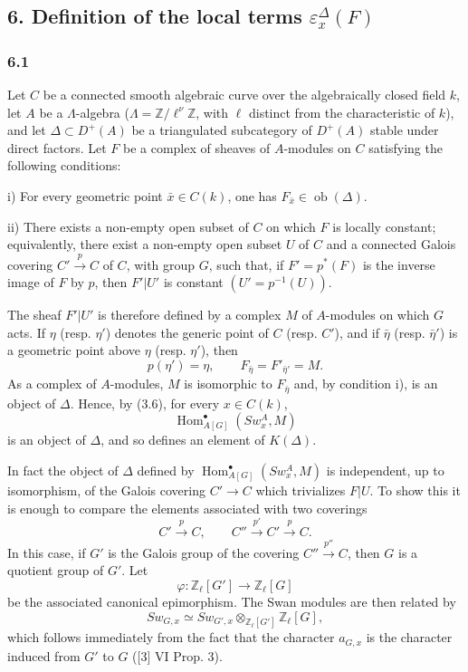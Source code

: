 \documentclass[11pt]{article}
\DeclareMathOperator{\Hom}{Hom}
\providecommand{\Ob}{\operatorname{ob}}
\providecommand{\Hom}{\operatorname{Hom}}
\providecommand{\Ob}{\operatorname{ob}}
\providecommand{\Ob}{\operatorname{Ob}}
\providecommand{\Hom}{\operatorname{Hom}}
\providecommand{\Ob}{\operatorname{ob}}
\begin{document}
\subsection*{6. Definition of the local terms $\varepsilon_x^\Delta(F)$}

\subsubsection*{6.1}

Let $C$ be a connected smooth algebraic curve over the algebraically closed field $k$, let $A$ be a $\Lambda$-algebra ($\Lambda=\mathbb Z/\ell^\nu\mathbb Z$, with $\ell$ distinct from the characteristic of $k$), and let $\Delta\subset D^+(A)$ be a triangulated subcategory of $D^+(A)$ stable under direct factors. Let $F$ be a complex of sheaves of $A$-modules on $C$ satisfying the following conditions:

i) For every geometric point $\bar x\in C(k)$, one has $F_{\bar x}\in\Ob(\Delta)$.

ii) There exists a non-empty open subset of $C$ on which $F$ is locally constant; equivalently, there exist a non-empty open subset $U$ of $C$ and a connected Galois covering $C'\xrightarrow{p}C$ of $C$, with group $G$, such that, if $F'=p^*(F)$ is the inverse image of $F$ by $p$, then $F'|U'$ is constant $(U'=p^{-1}(U))$.

The sheaf $F'|U'$ is therefore defined by a complex $M$ of $A$-modules on which $G$ acts. If $\eta$ (resp. $\eta'$) denotes the generic point of $C$ (resp. $C'$), and if $\bar\eta$ (resp. $\bar\eta'$) is a geometric point above $\eta$ (resp. $\eta'$), then
\[
p(\eta')=\eta,\qquad
F_{\bar\eta}=F'_{\bar\eta'}=M.
\tag{6.1.1}
\]
As a complex of $A$-modules, $M$ is isomorphic to $F_{\bar\eta}$ and, by condition i), is an object of $\Delta$. Hence, by (3.6), for every $x\in C(k)$,
\[
\Hom^\bullet_{A[G]}(Sw_x^A,M)
\]
is an object of $\Delta$, and so defines an element of $K(\Delta)$.

In fact the object of $\Delta$ defined by $\Hom^\bullet_{A[G]}(Sw_x^A,M)$ is independent, up to isomorphism, of the Galois covering $C'\to C$ which trivializes $F|U$. To show this it is enough to compare the elements associated with two coverings
\[
C'\xrightarrow{p}C,\qquad C''\xrightarrow{p'}C'\xrightarrow{p}C.
\]
In this case, if $G'$ is the Galois group of the covering $C''\xrightarrow{p''}C$, then $G$ is a quotient group of $G'$. Let
\[
\varphi:\mathbb Z_\ell[G']\longrightarrow \mathbb Z_\ell[G]
\]
be the associated canonical epimorphism. The Swan modules are then related by
\[
Sw_{G,x}\simeq Sw_{G',x}\otimes_{\mathbb Z_\ell[G']}\mathbb Z_\ell[G],
\]
which follows immediately from the fact that the character $a_{G,x}$ is the character induced from $G'$ to $G$ ([3] VI Prop. 3).
\end{document}
